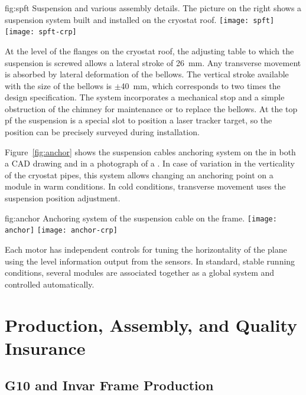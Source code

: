 \begin{dunefigure}{fig:spft}
{Suspension \fdth and various assembly details. The picture on the right shows a suspension system built and installed on the  cryostat roof.}
\texttt{[image: spft]}
\texttt{[image: spft-crp]}
\end{dunefigure}
At the level of the flanges on the cryostat roof, the adjusting table to which the suspension \fdth is screwed allows a lateral stroke of \SI{26}{mm}. Any transverse movement is absorbed by lateral deformation of the bellows.
The vertical stroke available with the  size of the bellows is $\pm$\SI{40}{mm}, which corresponds to two times the design specification.
The system incorporates a  mechanical stop and a simple obstruction of the chimney for maintenance or to replace the bellows.
At the top pf the suspension \fdth is a special slot to position a laser tracker target,
so the \fdth position can be precisely surveyed during installation.

Figure~\ref{fig:anchor} shows the suspension cables anchoring system on the  in both a CAD drawing and in a photograph of a . 
In case of variation in the verticality of the cryostat pipes, this system allows changing an anchoring point on a module in warm conditions. In cold conditions, transverse movement uses the suspension \fdth position adjustment.
\begin{dunefigure}{fig:anchor}
{Anchoring system of the suspension cable on the  frame.}
\texttt{[image: anchor]}
\texttt{[image: anchor-crp]}
\end{dunefigure}
Each motor has independent controls for tuning the horizontality of the plane using the level information output from the  
sensors. In standard, stable running conditions, several  modules are associated together as a global system and controlled automatically.

\section{Production, Assembly, and Quality Insurance}
\label{sec:dp-crp-prod-assy}

\subsection{G10 and Invar Frame Production}
\label{sec:dp-crp-frame}

